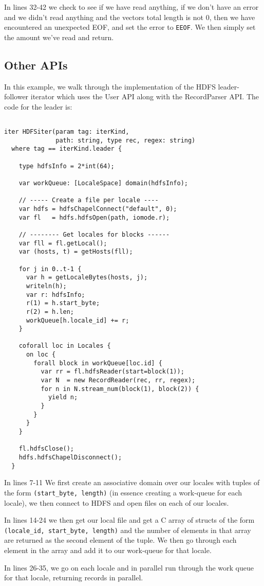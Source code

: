 In lines 32-42 we check to see if we have read anything, if we don't have an error
and we didn't read anything and the vectors total length is not 0, then we have
encountered an unexpected EOF, and set the error to {\tt EEOF}. We then simply set the
amount we've read and return.

\subsection{Other APIs}

In this example, we walk through the implementation of the HDFS leader-follower
iterator which uses the User API along with the RecordParser API. The code for the
leader is:
\begin{lstlisting}

iter HDFSiter(param tag: iterKind, 
              path: string, type rec, regex: string)
  where tag == iterKind.leader {

    type hdfsInfo = 2*int(64);

    var workQueue: [LocaleSpace] domain(hdfsInfo);

    // ----- Create a file per locale ----
    var hdfs = hdfsChapelConnect("default", 0);
    var fl   = hdfs.hdfsOpen(path, iomode.r);

    // -------- Get locales for blocks ------
    var fll = fl.getLocal();
    var (hosts, t) = getHosts(fll);

    for j in 0..t-1 {
      var h = getLocaleBytes(hosts, j);
      writeln(h);
      var r: hdfsInfo;
      r(1) = h.start_byte;
      r(2) = h.len;
      workQueue[h.locale_id] += r;
    }

    coforall loc in Locales {
      on loc {
        forall block in workQueue[loc.id] {
          var rr = fl.hdfsReader(start=block(1));
          var N  = new RecordReader(rec, rr, regex);
          for n in N.stream_num(block(1), block(2)) {
            yield n;
          }
        }
      }
    }

    fl.hdfsClose();
    hdfs.hdfsChapelDisconnect();
  }
\end{lstlisting}

In lines 7-11 We first create an associative domain over our locales with tuples of
the form {\tt (start\_byte, length)} (in essence creating a work-queue for each locale),
we then connect to HDFS and open files on each of our locales.

In lines 14-24 we then get our local file and get a C array of structs of
the form {\tt (locale\_id, start\_byte, length)} and the number of elements in that array are returned as the
second element of the tuple. We then go through each element in the array and add it
to our work-queue for that locale.

In lines 26-35, we go on each locale and in parallel run through the work queue for that
locale, returning records in parallel.




